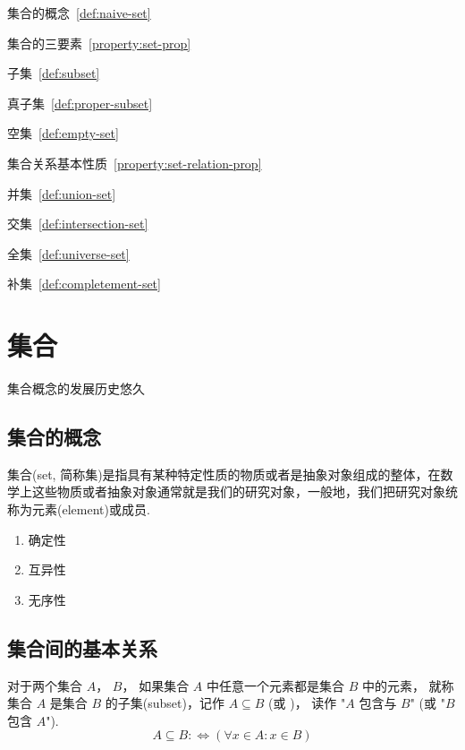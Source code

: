 \documentclass[../main.tex]{subfiles}
\begin{document}
\begin{introduction}
    \item 集合的概念~\ref{def:naive-set}
    \item 集合的三要素~\ref{property:set-prop}
    \item 子集~\ref{def:subset}
    \item 真子集~\ref{def:proper-subset}
    \item 空集~\ref{def:empty-set}
    \item 集合关系基本性质~\ref{property:set-relation-prop}
    \item 并集~\ref{def:union-set}
    \item 交集~\ref{def:intersection-set}
    \item 全集~\ref{def:universe-set}
    \item 补集~\ref{def:completement-set}
\end{introduction}

\section{集合}


集合概念的发展历史悠久

\subsection{集合的概念}

\begin{definition}[集合]\label{def:naive-set}
    \textcolor{main}{集合}(set, 简称集)是指具有某种特定性质的物质或者是抽象对象组成的整体，在数学上这些物质或者抽象对象通常就是我们的研究对象，一般地，我们把研究对象统称为\textcolor{main}{元素}(element)或成员.
\end{definition}

\begin{property}\label{property:set-prop}
    \begin{enumerate}
        \item 确定性
        \item 互异性
        \item 无序性
    \end{enumerate}
\end{property}

\subsection{集合间的基本关系}
\begin{definition}[子集]\label{def:subset}
   对于两个集合 $A$， $B$， 如果集合 $A$ 中任意一个元素都是集合 $B$ 中的元素， 就称集合 $A$ 是集合 $B$ 的\textcolor{main}{子集}(subset)，记作 $A \subseteq B$ (或 )， 读作 "$A$ 包含与 $B$" (或 "$B$ 包含 $A$"). 
   \begin{equation*}
       A \subseteq B :\Leftrightarrow (\forall x \in A: x \in B)
   \end{equation*}
\end{definition}
\end{document}
